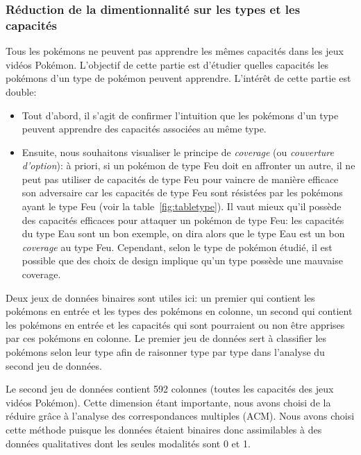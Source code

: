 \documentclass[a4paper,12pt]{article}
\begin{document}
\subsubsection{Réduction de la dimentionnalité sur les types et les capacités}
Tous les pokémons ne peuvent pas apprendre les mêmes capacités dans les jeux
vidéos Pokémon. L'objectif de cette partie est d'étudier quelles capacités les
pokémons d'un type de pokémon peuvent apprendre. L'intérêt de cette partie est
double:   
\begin{itemize}
    \item 
    Tout d'abord, il s'agit de confirmer l'intuition que les pokémons d'un type
    peuvent apprendre des capacités associées au même type. 
    \item Ensuite, nous souhaitons visualiser le principe de \textit{coverage}
    (ou \textit{couverture d'option}): à priori, si un pokémon de type Feu doit
    en affronter un autre, il ne peut pas utiliser de capacités de type Feu pour
    vaincre de manière efficace son adversaire car les capacités de type Feu
    sont résistées par les pokémons ayant le type Feu (voir la
    table~\ref{fig:tabletype}). Il vaut mieux qu'il possède des capacités
    efficaces pour attaquer un pokémon de type Feu: les capacités du type Eau
    sont un bon exemple, on dira alors que le type Eau est un bon
    \textit{coverage} au type Feu. Cependant, selon le type de pokémon étudié,
    il est possible que des choix de design implique qu'un type possède une
    mauvaise coverage. 
\end{itemize}
Deux jeux de données binaires sont utiles ici: un premier qui contient les
pokémons en entrée et les types des pokémons en colonne, un second qui contient
les pokémons en entrée et les capacités qui sont pourraient ou non être apprises
par ces pokémons en colonne. Le premier jeu de données sert à classifier les
pokémons selon leur type afin de raisonner type par type dans l'analyse du
second jeu de données.

Le second jeu de données contient 592 colonnes (toutes les capacités des jeux
vidéos Pokémon). Cette dimension étant importante, nous avons choisi de la
réduire grâce à l'analyse des correspondances multiples (ACM). Nous avons choisi
cette méthode puisque les données étaient binaires donc assimilables à des
données qualitatives dont les seules modalités sont 0 et 1. 
\end{document}
